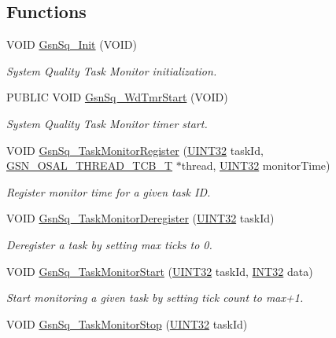 \subsection*{Functions}
\begin{DoxyCompactItemize}
\item 
VOID \hyperlink{a00675_gad10ad5f9dbac0e77f484ca53319e52ad}{GsnSq\_\-Init} (VOID)
\begin{DoxyCompactList}\small\item\em System Quality Task Monitor initialization. \end{DoxyCompactList}\item 
PUBLIC VOID \hyperlink{a00675_gaf709cf6cb9df1be311084cdf383854a0}{GsnSq\_\-WdTmrStart} (VOID)
\begin{DoxyCompactList}\small\item\em System Quality Task Monitor timer start. \end{DoxyCompactList}\item 
VOID \hyperlink{a00675_gabfd6482b09418af5050000a0b7aff482}{GsnSq\_\-TaskMonitorRegister} (\hyperlink{a00660_gae1e6edbbc26d6fbc71a90190d0266018}{UINT32} taskId, \hyperlink{a00628_ga43c1eefe78fa26e478301976f96ac31f}{GSN\_\-OSAL\_\-THREAD\_\-TCB\_\-T} $\ast$thread, \hyperlink{a00660_gae1e6edbbc26d6fbc71a90190d0266018}{UINT32} monitorTime)
\begin{DoxyCompactList}\small\item\em Register monitor time for a given task ID. \end{DoxyCompactList}\item 
VOID \hyperlink{a00675_ga53008154a8350fc85d627cd563e4d1df}{GsnSq\_\-TaskMonitorDeregister} (\hyperlink{a00660_gae1e6edbbc26d6fbc71a90190d0266018}{UINT32} taskId)
\begin{DoxyCompactList}\small\item\em Deregister a task by setting max ticks to 0. \end{DoxyCompactList}\item 
VOID \hyperlink{a00675_ga96da464fdeb49f53790f74732ef808a9}{GsnSq\_\-TaskMonitorStart} (\hyperlink{a00660_gae1e6edbbc26d6fbc71a90190d0266018}{UINT32} taskId, \hyperlink{a00660_ga63021d67d54286c2163bcdb43a6f2569}{INT32} data)
\begin{DoxyCompactList}\small\item\em Start monitoring a given task by setting tick count to max+1. \end{DoxyCompactList}\item 
VOID \hyperlink{a00675_ga285d40bdd1cfff28b38cc49232859568}{GsnSq\_\-TaskMonitorStop} (\hyperlink{a00660_gae1e6edbbc26d6fbc71a90190d0266018}{UINT32} taskId)

\end{DoxyCompactItemize}
